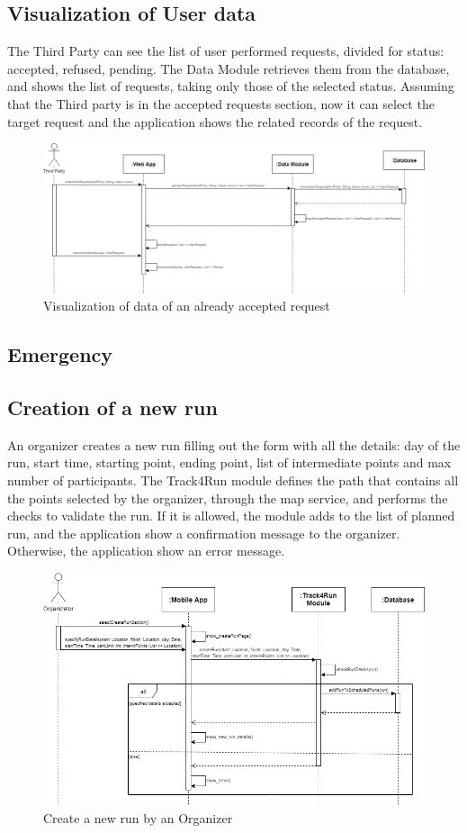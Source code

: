 \subsection{Visualization of User data  }
The Third Party can see the list of user performed requests, divided for status: accepted, refused, pending. The Data Module retrieves them from the database, and shows the list of requests, taking only those of the selected status. Assuming that the Third party is in the accepted requests section, now it can select the target request and the application shows the related records of the request.
\begin{figure}[H]
    \centering
    \includegraphics[scale=0.35]{DD/Pictures/showDataResult.png}
    \caption{Visualization of data of an already accepted request}
\end{figure}
\subsection{Emergency }
\subsection{ Creation of a new run}
An organizer creates a new run filling out the form with all the details: day of the run, start time, starting point, ending point, list of intermediate points and max number of participants. The Track4Run module defines the path that contains all the points selected by the organizer, through the map service, and performs the checks to validate the run. If it is allowed, the module adds to the list of planned run, and the application show a confirmation message to the organizer. Otherwise, the application show an error message.


\begin{figure}[H]
    \centering
    \includegraphics[scale=0.35]{DD/Pictures/createRunSeqDiagDD.png}
    \caption{Create a new run by an Organizer}
\end{figure}

